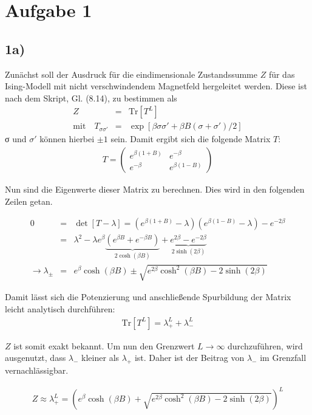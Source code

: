 \section*{Aufgabe 1}
\subsection*{1a)}
Zunächst soll der Ausdruck für die eindimensionale Zustandssumme $Z$ für das
Ising-Modell mit nicht verschwindendem Magnetfeld hergeleitet werden. Diese ist
nach dem Skript, Gl. (8.14), zu bestimmen als
\begin{eqnarray}
Z &=& \mathrm{Tr}\left[T^L\right]\\
\mathrm{mit\quad} T_{σσ'} &=& \exp[βσσ' + βB(σ+σ')/2]
\end{eqnarray}
σ und $σ'$ können hierbei $\pm 1$ sein. Damit ergibt sich die folgende Matrix $T$:
\begin{eqnarray}
T = \begin{pmatrix} e^{β(1+B)} & e^{-β} \\ e^{-β} & e^{β(1-B)} \end{pmatrix}
\end{eqnarray}

Nun sind die Eigenwerte dieser Matrix zu berechnen. Dies wird in den folgenden
Zeilen getan.

\begin{eqnarray}
0 &=& \det[T-λ] = (e^{β(1+B)}-λ)(e^{β(1-B)}-λ) - e^{-2β}\\
&=& λ^2 - λe^β\underbrace{\left(e^{βB} + e^{-βB}\right)}_{2\cosh(βB)} + \underbrace{e^{2β} - e^{-2β}}_{2\sinh(2β)}\\
→ λ_{\pm} &=& e^β\cosh(βB) \pm \sqrt{e^{2β}\cosh^2(βB) - 2\sinh(2β)}
\end{eqnarray}

Damit lässt sich die Potenzierung und anschließende Spurbildung der Matrix leicht
analytisch durchführen:
\begin{eqnarray}
\mathrm{Tr}[T^L] = λ_+^L + λ_-^L
\end{eqnarray}

$Z$ ist somit exakt bekannt. Um nun den Grenzwert $L→∞$ durchzuführen, wird ausgenutzt,
dass $λ_-$ kleiner als $λ_+$ ist. Daher ist der Beitrag von $λ_-$ im Grenzfall
vernachlässigbar.

\begin{eqnarray}
Z \approx λ_+^L = \left(e^β\cosh(βB) + \sqrt{e^{2β}\cosh^2(βB) - 2\sinh(2β)}\right)^L
\end{eqnarray}

